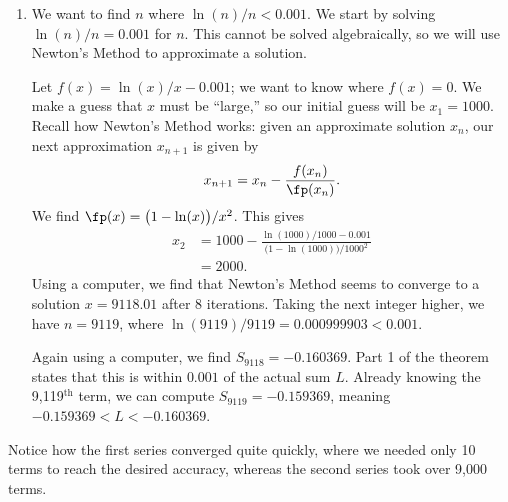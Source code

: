{\begin{enumerate}
	\item		We want to find $n$ where $\ln (n)/n < 0.001$. We start by solving $\ln (n)/n = 0.001$ for $n$. This cannot be solved algebraically, so we will use Newton's Method to approximate a solution. 
	
	Let $f(x) = \ln(x)/x-0.001$; we want to know where $f(x) = 0$. We make a guess that $x$ must be ``large,'' so our initial guess will be $x_1=1000$. Recall how Newton's Method works: given an approximate solution $x_n$, our next approximation $x_{n+1}$ is given by
	$$x_{n+1} = x_n - \frac{f(x_n)}{\fp(x_n)}.$$
	We find $\fp(x) = \big(1-\ln(x)\big)/x^2$. This gives
	\begin{align*}
	x_2 &= 1000 - \frac{\ln(1000)/1000-0.001}{\big(1-\ln(1000)\big)/1000^2} \\
			&= 2000.
	\end{align*}
	Using a computer, we find that Newton's Method seems to converge to a solution $x=9118.01$ after 8 iterations. Taking the next integer higher, we have $n=9119$, where $\ln(9119)/9119 =0.000999903<0.001$.
	
	Again using a computer, we find $S_{9118} = -0.160369$. Part 1 of the theorem states that this is within $0.001$ of the actual sum $L$. Already knowing the 9,119$^\text{th}$ term, we can compute $S_{9119} = -0.159369$, meaning $-0.159369 < L < -0.160369$. 
	
\end{enumerate}
Notice how the first series converged quite quickly, where we needed only 10 terms to reach the desired accuracy, whereas the second series took over 9,000 terms.
}\\

